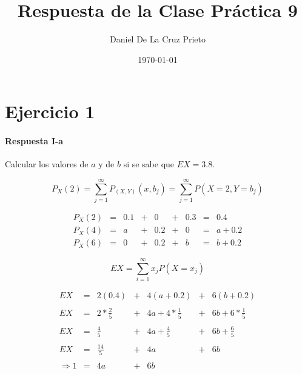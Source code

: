 \documentclass[12pt]{article}
\begin{document}
	\title{Respuesta de la Clase Pr\'actica 9}
	\author{Daniel De La Cruz Prieto}
	\date{\today}
	
	\maketitle
	
	
	\section*{Ejercicio 1}
	
	\paragraph{Respuesta I-a }
	
    Calcular los valores de $a$ y de $b$ si se sabe que $EX = 3.8.$
    
	\begin{equation*}
		P_X\left(2\right) = \sum_{j=1}^{\infty}	P_{\left(X,Y\right)} \left(x,b_j\right) = \sum_{j=1}^{\infty} P\left(X=2,Y=b_j\right)	
	\end{equation*}
	
	\begin{equation*}
		\begin{array}{rcccccccl}
		P_X\left(2\right) & = & 0.1& +& 0 &+& 0.3 & = & 0.4
		\\
		P_X\left(4\right) & = & a &+& 0.2 &+ & 0 & = & a + 0.2
		\\
	    P_X\left(6\right) & = & 0& +& 0.2& + & b & = & b + 0.2
		\end{array}
	\end{equation*}
	
	\begin{equation*}
	    EX = \sum_{i=1}^{\infty} x_j P\left(X=x_j\right)
    \end{equation*}
    
	\begin{equation*}
	  \begin{array}{rcccccl}
	  EX & = & 2(0.4)		   & + & 4(a+0.2)             & + & 6(b+0.2)
	  \\
	  \\
	  EX & = & 2 * \frac{2}{5} & + & 4a + 4 * \frac{1}{5} & + & 6b + 6 * \frac{1}{5}	
	  \\
	  \\
	  EX & = & \frac{4}{5}     & + & 4a + \frac{4}{5}     & + & 6b + \frac{6}{5}
	  \\
	  \\
	  EX & = & \frac{14}{5}   & + & 4a                    & + & 6b 
	  \\
	  \\
	  \Rightarrow 1 & = & 4a & + & 6b  
	  \end{array}
	\end{equation*}
	
\end{document}
